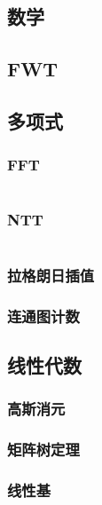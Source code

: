 \documentclass[a4paper, twoside]{article}
\begin{document}
	\begin{multicols}{2}

		\section{数学}
			\subsection{FWT}
				

			\subsection{多项式}
				\subsubsection{FFT}
					\inputminted{cpp}{../src-midori/math/MTT.cpp}
				\subsubsection{NTT}
					\inputminted{cpp}{../src-midori/math/poly.cpp}
				\subsubsection{拉格朗日插值}
					
				\subsubsection{连通图计数}
					
			
			\subsection{线性代数}
				\subsubsection{高斯消元}
					
				\subsubsection{矩阵树定理}
					
				\subsubsection{线性基}
					\inputminted{cpp}{../src-midori/math/线性基上二分.cpp}
			

\end{multicols}
\end{document}

